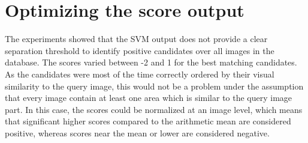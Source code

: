 \section{Optimizing the score output}

The experiments showed that the \ac{SVM} output does not provide a clear separation threshold to identify positive candidates over all images in the database. The scores varied between -2 and 1 for the best matching candidates. As the candidates were most of the time correctly ordered by their visual similarity to the query image, this would not be a problem under the assumption that every image contain at least one area which is similar to the query image part. In this case, the scores could be normalized at an image level, which means that significant higher scores compared to the arithmetic mean are considered positive, whereas scores near the mean or lower are considered negative.

